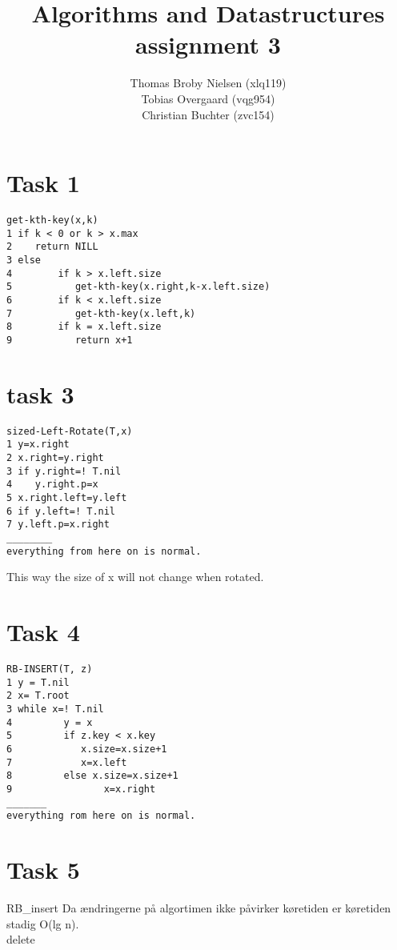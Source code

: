 \documentclass[12pt]{article}
\title{Algorithms and Datastructures assignment 3}
\author{Thomas Broby Nielsen (xlq119)\\ Tobias Overgaard (vqg954)\\ Christian Buchter (zvc154)}
\begin{document}
\maketitle

\tableofcontents

\pagebreak
\section{Task 1}
\begin{verbatim}
get-kth-key(x,k)
1 if k < 0 or k > x.max
2    return NILL
3 else
4        if k > x.left.size
5           get-kth-key(x.right,k-x.left.size)
6        if k < x.left.size
7           get-kth-key(x.left,k)
8        if k = x.left.size
9           return x+1
\end{verbatim}

\newpage
\section{task 3}
\begin{verbatim}
sized-Left-Rotate(T,x)
1 y=x.right
2 x.right=y.right
3 if y.right=! T.nil
4    y.right.p=x
5 x.right.left=y.left
6 if y.left=! T.nil
7 y.left.p=x.right
________
everything from here on is normal.
\end{verbatim}
This way the size of x will not change when rotated.
\newpage

\section{Task 4}
\begin{verbatim}
RB-INSERT(T, z)
1 y = T.nil
2 x= T.root
3 while x=! T.nil
4         y = x
5         if z.key < x.key
6            x.size=x.size+1
7            x=x.left
8         else x.size=x.size+1
9                x=x.right
_______
everything rom here on is normal.
\end{verbatim}
\newpage

\section{Task 5}
RB\_insert Da ændringerne på algortimen ikke påvirker køretiden er køretiden stadig O(lg n).\\
delete
\end{document}

